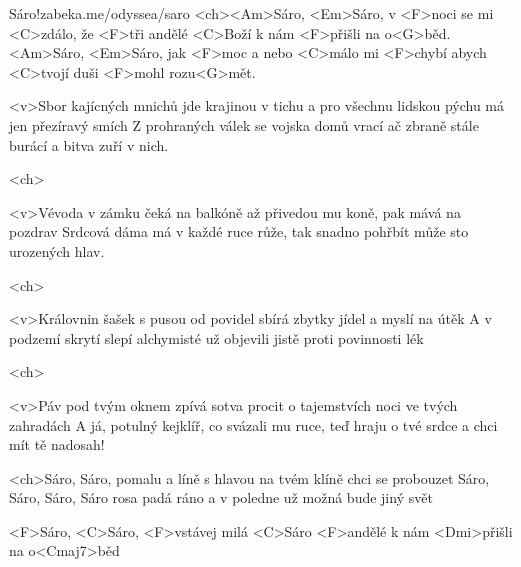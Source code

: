 



\songtitlepage
\listofsongs[1]

\begin{song}[Traband]{1}{Sáro!}{zabeka.me/odyssea/saro}
	<ch><Am>Sáro, <Em>Sáro, v <F>noci se mi <C>zdálo,
	že <F>tři andělé <C>Boží k nám <F>přišli na o<G>běd.
	<Am>Sáro, <Em>Sáro, jak <F>moc a nebo <C>málo
	mi <F>chybí abych <C>tvojí duši <F>mohl rozu<G>mět.

	<v>Sbor kajícných mnichů jde krajinou v tichu
	a pro všechnu lidskou pýchu má jen přezíravý smích
	Z prohraných válek se vojska domů vrací
	ač zbraně stále burácí a bitva zuří v nich.

	<ch>

	<v>Vévoda v zámku čeká na balkóně
	až přivedou mu koně, pak mává na pozdrav
	Srdcová dáma má v každé ruce růže,
	tak snadno pohřbít může sto urozených hlav.

	<ch>

	<v>Královnin šašek s pusou od povidel
	sbírá zbytky jídel a myslí na útěk
	A v podzemí skrytí slepí alchymisté
	už objevili jistě proti povinnosti lék

	<ch>

	<v>Páv pod tvým oknem zpívá sotva procit
	o tajemstvích noci ve tvých zahradách
	A já, potulný kejklíř, co svázali mu ruce,
	teď hraju o tvé srdce a chci mít tě nadosah!

	<ch>Sáro, Sáro, pomalu a líně
	s hlavou na tvém klíně chci se probouzet
	Sáro, Sáro, Sáro, Sáro rosa padá ráno
	a v poledne už možná bude jiný svět

	<F>Sáro, <C>Sáro, <F>vstávej milá <C>Sáro
	<F>andělé k nám <Dmi>přišli na o<Cmaj7>běd


\end{song}
